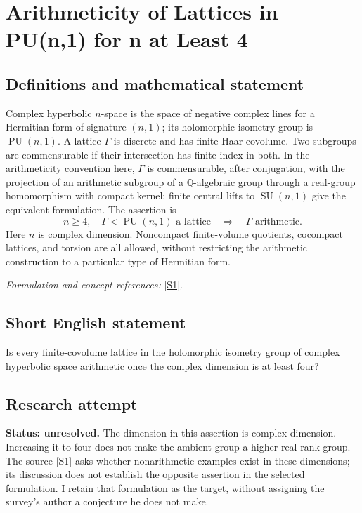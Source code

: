 \documentclass[11pt]{article}
\begin{document}
\section*{\texorpdfstring{Arithmeticity of Lattices in PU(n,1) for n at Least 4}{Arithmeticity of Lattices in PU(n,1) for n at Least 4}}\label{351}
\subsection{Definitions and mathematical statement}
Complex hyperbolic $n$-space is the space of negative complex lines for a Hermitian form of signature $(n,1)$; its holomorphic isometry group is $\operatorname{PU}(n,1)$. A lattice $\Gamma$ is discrete and has finite Haar covolume. Two subgroups are commensurable if their intersection has finite index in both. In the arithmeticity convention here, $\Gamma$ is commensurable, after conjugation, with the projection of an arithmetic subgroup of a ${\mathbb{Q}}$-algebraic group through a real-group homomorphism with compact kernel; finite central lifts to $\operatorname{SU}(n,1)$ give the equivalent formulation. The assertion is
\[
 n\ge4,\quad\Gamma<\operatorname{PU}(n,1)\text{ a lattice}
 \quad\Longrightarrow\quad\Gamma\text{ arithmetic}.
\]
Here $n$ is complex dimension. Noncompact finite-volume quotients, cocompact lattices, and torsion are all allowed, without restricting the arithmetic construction to a particular type of Hermitian form.
\par\smallskip\textit{Formulation and concept references:} \href{https://www.maths.dur.ac.uk/users/j.r.parker/img/Lattices.pdf}{[S1]}.

\subsection{Short English statement}
Is every finite-covolume lattice in the holomorphic isometry group of complex hyperbolic space arithmetic once the complex dimension is at least four?
\subsection{Research attempt}
\textbf{Status: unresolved.} The dimension in this assertion is complex dimension. Increasing it to four does not make the ambient group a higher-real-rank group. The source [S1] asks whether nonarithmetic examples exist in these dimensions; its discussion does not establish the opposite assertion in the selected formulation. I retain that formulation as the target, without assigning the survey's author a conjecture he does not make.
\end{document}
